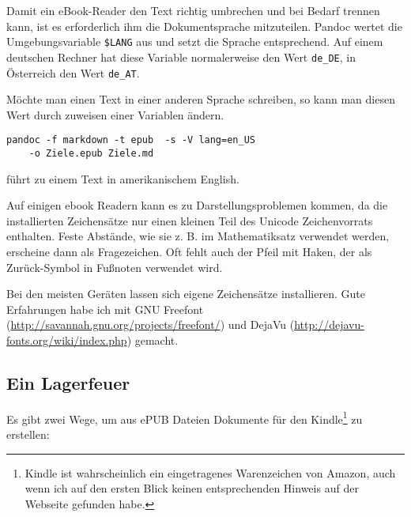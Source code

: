 \documentclass[11pt,ngerman,a4paper]{article}
\begin{document}
Damit ein eBook-Reader den Text richtig umbrechen und bei Bedarf trennen
kann, ist es erforderlich ihm die Dokumentsprache mitzuteilen. Pandoc
wertet die Umgebungsvariable \texttt{\$LANG} aus und setzt die Sprache
entsprechend. Auf einem deutschen Rechner hat diese Variable
normalerweise den Wert \texttt{de\_DE}, in Österreich den Wert
\texttt{de\_AT}.

Möchte man einen Text in einer anderen Sprache schreiben, so kann man
diesen Wert durch zuweisen einer Variablen ändern.

\begin{verbatim}
pandoc -f markdown -t epub  -s -V lang=en_US
    -o Ziele.epub Ziele.md
\end{verbatim}

führt zu einem Text in amerikanischem English.

Auf einigen ebook Readern kann es zu Darstellungsproblemen kommen, da
die installierten Zeichensätze nur einen kleinen Teil des Unicode
Zeichenvorrats enthalten. Feste Abstände, wie sie z. B. im
Mathematiksatz verwendet werden, erscheine dann als Fragezeichen. Oft
fehlt auch der Pfeil mit Haken, der als Zurück-Symbol in Fußnoten
verwendet wird.

Bei den meisten Geräten lassen sich eigene Zeichensätze installieren.
Gute Erfahrungen habe ich mit GNU Freefont
(\url{http://savannah.gnu.org/projects/freefont/}) und DejaVu
(\url{http://dejavu-fonts.org/wiki/index.php}) gemacht.

\subsection{Ein Lagerfeuer}

Es gibt zwei Wege, um aus ePUB Dateien Dokumente für den
Kindle\footnote{Kindle ist wahrscheinlich ein eingetragenes Warenzeichen
  von Amazon, auch wenn ich auf den ersten Blick keinen entsprechenden
  Hinweis auf der Webseite gefunden habe.} zu erstellen:
\end{document}
